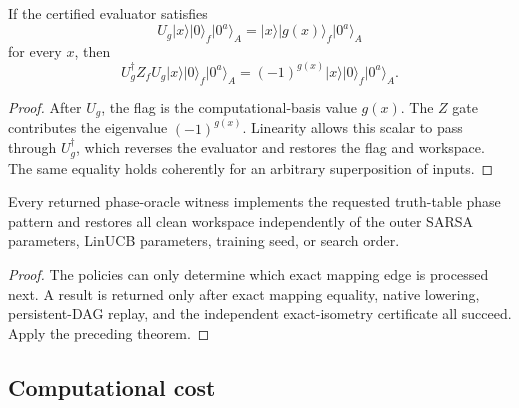 \begin{theorem}
If the certified evaluator satisfies
\begin{equation}
U_g\lvert x\rangle\lvert0\rangle_f\lvert0^a\rangle_A
=\lvert x\rangle\lvert g(x)\rangle_f\lvert0^a\rangle_A
\end{equation}
for every $x$, then
\begin{equation}
U_g^\dagger Z_fU_g
\lvert x\rangle\lvert0\rangle_f\lvert0^a\rangle_A
=(-1)^{g(x)}
\lvert x\rangle\lvert0\rangle_f\lvert0^a\rangle_A.
\label{eq:phase-assembly-theorem}
\end{equation}
\end{theorem}
\begin{proof}
After $U_g$, the flag is the computational-basis value $g(x)$.  The $Z$ gate contributes the eigenvalue $(-1)^{g(x)}$.  Linearity allows this scalar to pass through $U_g^\dagger$, which reverses the evaluator and restores the flag and workspace.  The same equality holds coherently for an arbitrary superposition of inputs.
\end{proof}

\begin{corollary}
Every returned phase-oracle witness implements the requested truth-table phase pattern and restores all clean workspace independently of the outer SARSA parameters, LinUCB parameters, training seed, or search order.
\end{corollary}
\begin{proof}
The policies can only determine which exact mapping edge is processed next.  A result is returned only after exact mapping equality, native lowering, persistent-DAG replay, and the independent exact-isometry certificate all succeed.  Apply the preceding theorem.
\end{proof}

\subsection{Computational cost}

